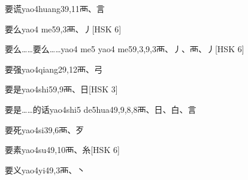 \begin{EntryWithPhonetic}{要谎}{yao4huang3}{9,11}{⾑、⾔}
\end{EntryWithPhonetic}

\begin{EntryWithPhonetic}{要么}{yao4 me5}{9,3}{⾑、⼃}[HSK 6]
\end{EntryWithPhonetic}

\begin{EntryWithPhonetic}{要么……要么……}{yao4 me5 yao4 me5}{9,3,9,3}{⾑、⼃、⾑、⼃}[HSK 6]
\end{EntryWithPhonetic}

\begin{EntryWithPhonetic}{要强}{yao4qiang2}{9,12}{⾑、⼸}
\end{EntryWithPhonetic}

\begin{EntryWithPhonetic}{要是}{yao4shi5}{9,9}{⾑、⽇}[HSK 3]
\end{EntryWithPhonetic}

\begin{EntryWithPhonetic}{要是……的话}{yao4shi5 de5hua4}{9,9,8,8}{⾑、⽇、⽩、⾔}
\end{EntryWithPhonetic}

\begin{EntryWithPhonetic}{要死}{yao4si3}{9,6}{⾑、⽍}
\end{EntryWithPhonetic}

\begin{EntryWithPhonetic}{要素}{yao4su4}{9,10}{⾑、⽷}[HSK 6]
\end{EntryWithPhonetic}

\begin{EntryWithPhonetic}{要义}{yao4yi4}{9,3}{⾑、⼂}
\end{EntryWithPhonetic}


